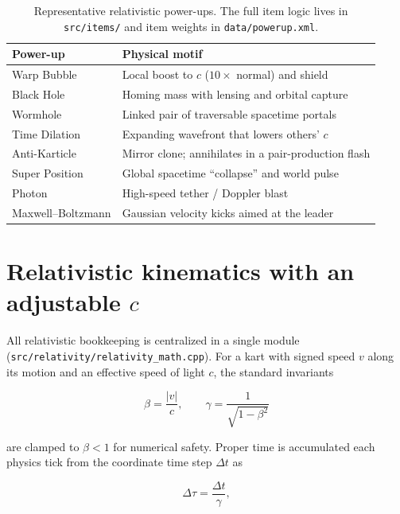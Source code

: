 \documentclass[aip,amsmath,amssymb,reprint,nofootinbib]{revtex4-2}
\begin{document}
\begin{table}[t]
\caption{Representative relativistic power-ups. The full item logic lives in
\texttt{src/items/} and item weights in \texttt{data/powerup.xml}.}
\label{tab:items}
\begin{ruledtabular}
\begin{tabular}{ll}
Power-up & Physical motif \\
\hline
Warp Bubble    & Local boost to $c$ ($10\times$ normal) and shield \\
Black Hole     & Homing mass with lensing and orbital capture \\
Wormhole       & Linked pair of traversable spacetime portals \\
Time Dilation  & Expanding wavefront that lowers others' $c$ \\
Anti-Karticle  & Mirror clone; annihilates in a pair-production flash \\
Super Position & Global spacetime ``collapse'' and world pulse \\
Photon         & High-speed tether / Doppler blast \\
Maxwell--Boltzmann & Gaussian velocity kicks aimed at the leader \\
\end{tabular}
\end{ruledtabular}
\end{table}

\section{Relativistic kinematics with an adjustable \texorpdfstring{$c$}{c}}
\label{sec:kinematics}

All relativistic bookkeeping is centralized in a single module
(\texttt{src/relativity/relativity\_math.cpp}). For a kart with signed speed $v$
along its motion and an effective speed of light $c$, the standard invariants

\begin{equation}
\beta = \frac{|v|}{c}, \qquad
\gamma = \frac{1}{\sqrt{1-\beta^2}}
\end{equation}

are clamped to $\beta < 1$ for numerical safety. Proper time is accumulated each
physics tick from the coordinate time step $\Delta t$ as

\begin{equation}
\Delta\tau = \frac{\Delta t}{\gamma},
\label{eq:propertime}
\end{equation}
\end{document}
